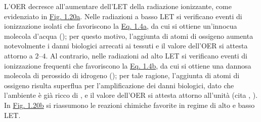 \documentclass[12pt,a4paper,twoside]{report}
\begin{document}
	L'OER decresce all'aumentare dell'LET della radiazione ionizzante, come evidenziato in \hyperref[fig:let_oer]{Fig. 1.20a}. Nelle radiazioni a basso LET si verificano eventi di ionizzazione isolati che favoriscono la \hyperref[eq:prodotto1]{Eq. 1.4a}, da cui si ottiene un'innocua molecola d'acqua (); per questo motivo, l'aggiunta di atomi di ossigeno aumenta notevolmente i danni biologici arrecati ai tessuti e il valore dell'OER si attesta attorno a $2$--$4$. Al contrario, nelle radiazioni ad alto LET si verificano eventi di ionizzazione frequenti che favoriscono la \hyperref[eq:prodotto2]{Eq. 1.4b}, da cui si ottiene una dannosa molecola di perossido di idrogeno (); per tale ragione, l'aggiunta di atomi di ossigeno risulta superflua per l'amplificazione dei danni biologici, dato che l'ambiente è già ricco di , e il valore dell'OER si attesta attorno all'unità (cita
	,
	). In \hyperref[fig:reaction_let]{Fig. 1.20b} si riassumono le reazioni chimiche favorite in regime di alto e basso LET.
\end{document}
